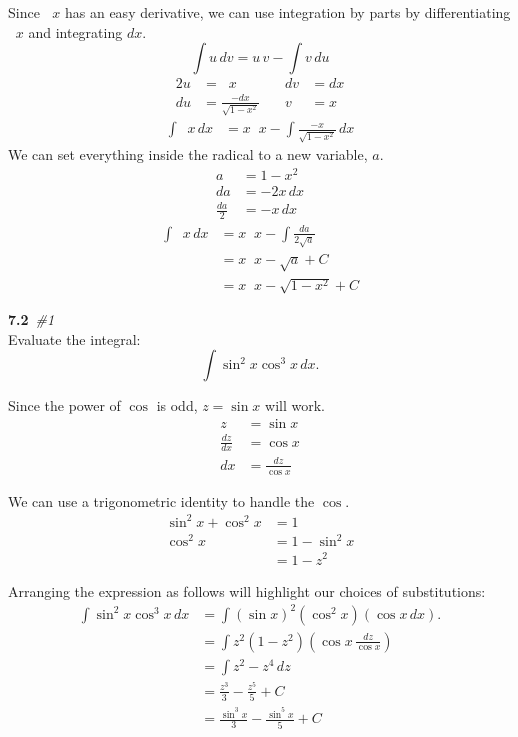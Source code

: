 \documentclass[12pt]{article}
\DeclareMathOperator{\invcos}{cos^{-1}}
\newcommand{\bfit}[2]{\textbf{#1}\ \textit{#2}}
\newcommand{\double}[0]{\par\null\par}
\renewcommand{\section}[2]{\double\LARGE\bfit{#1}{\##2}\normalsize\\}
\newcommand{\paren}[1]{\left({#1}\right)}
\let\xint\int
\renewcommand{\int}[2]{\xint{#1}\,d#2}
\begin{document}
Since $\invcos{x}$ has an easy derivative, we can use integration by parts by differentiating $\invcos{x}$ and integrating $dx$.
%
\begin{equation*}
\int{u}{v}=u\,v-\int{v}{u}
\end{equation*}
%
\begin{alignat*}{2}
u&=\invcos{x} &\quad dv&=dx \\
du&=\frac{-dx}{\sqrt{1-x^2}} &\quad v&=x
\end{alignat*}
%
\begin{align*}
\int{\invcos{x}}{x}&=x\invcos{x}-\int{\frac{-x}{\sqrt{1-x^2}}}{x}
\end{align*}
%
We can set everything inside the radical to a new variable, $a$.
%
\begin{align*}
a&=1-x^2 \\
da&=-2x\,dx \\
\frac{da}{2}&=-x\,dx
\end{align*}
%
\begin{align*}
\int{\invcos{x}}{x}&=x\invcos{x}-\xint{\frac{da}{2\sqrt{a}}} \\
&=x\invcos{x}-\sqrt{a}+C \\
&=x\invcos{x}-\sqrt{1-x^2}+C
\end{align*}

\section{7.2}{1}
Evaluate the integral:
%
\begin{equation*}
\int{\sin^2{x}\cos^3{x}}{x}.
\end{equation*}\double

Since the power of $\cos$ is odd, $z=\sin{x}$ will work.
%
\begin{align*}
z&=\sin{x} \\
\frac{dz}{dx}&=\cos{x} \\
dx&=\frac{dz}{\cos{x}}
\end{align*}

We can use a trigonometric identity to handle the $\cos$.
%
\begin{align*}
\sin^2{x}+\cos^2{x}&=1 \\
\cos^2{x}&=1-\sin^2{x} \\
&=1-z^2
\end{align*}

Arranging the expression as follows will highlight our choices of substitutions:
%
\begin{align*}
\int{\sin^2{x}\cos^3{x}}{x}&=\xint\paren{\sin{x}}^2\paren{\cos^2{x}}\paren{\cos{x}\,dx}. \\
&=\xint{z}^2\paren{1-z^2}\paren{\cos{x}\,\frac{dz}{\cos{x}}} \\
&=\int{z^2-z^4}{z} \\
&=\frac{z^3}{3}-\frac{z^5}{5}+C \\
&=\frac{\sin^3{x}}{3}-\frac{\sin^5{x}}{5}+C
\end{align*}
\end{document}
